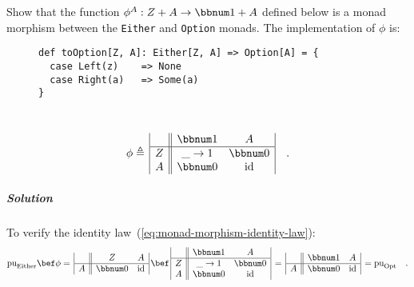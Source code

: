Show that the function $\phi^{A}:Z+A\rightarrow\bbnum 1+A$ defined
below is a monad morphism between the \lstinline!Either! and \lstinline!Option!
monads. The implementation of $\phi$ is:

\begin{wrapfigure}{l}{0.5\columnwidth}%
\vspace{-0.75\baselineskip}

\begin{lstlisting}
def toOption[Z, A]: Either[Z, A] => Option[A] = {
  case Left(z)    => None
  case Right(a)   => Some(a)
}
\end{lstlisting}
\vspace{-1.7\baselineskip}
\end{wrapfigure}%

~\vspace{-0.7\baselineskip}
\[
\phi\triangleq\,\begin{array}{|c||cc|}
 & \bbnum 1 & A\\
\hline Z & \_\rightarrow1 & \bbnum 0\\
A & \bbnum 0 & \text{id}
\end{array}\quad.
\]


\subparagraph{Solution}

To verify the identity law~(\ref{eq:monad-morphism-identity-law}):
\[
\text{pu}_{\text{Either}}\bef\phi=\,\begin{array}{|c||cc|}
 & Z & A\\
\hline A & \bbnum 0 & \text{id}
\end{array}\,\bef\,\begin{array}{|c||cc|}
 & \bbnum 1 & A\\
\hline Z & \_\rightarrow1 & \bbnum 0\\
A & \bbnum 0 & \text{id}
\end{array}\,=\,\begin{array}{|c||cc|}
 & \bbnum 1 & A\\
\hline A & \bbnum 0 & \text{id}
\end{array}\,=\text{pu}_{\text{Opt}}\quad.
\]

